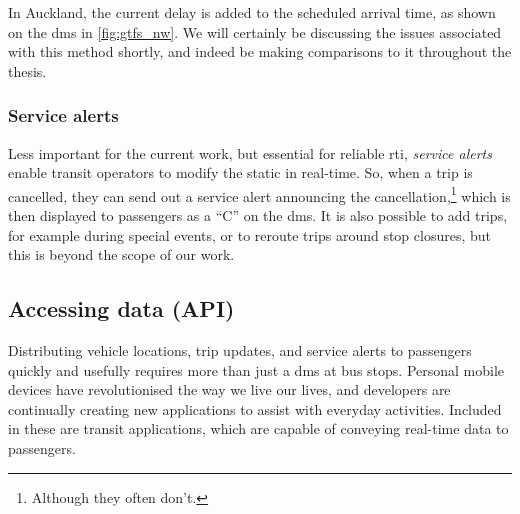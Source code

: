 In Auckland, the current delay is added to the scheduled arrival time, as shown on the \gls{dms} in \cref{fig:gtfs_nw}. We will certainly be discussing the issues associated with this method shortly, and indeed be making comparisons to it throughout the thesis.



\subsubsection{Service alerts}
\label{sec:gtfs_rt_alerts}

Less important for the current work, but essential for reliable \gls{rti}, \emph{service alerts} enable transit operators to modify the static \GTFS{} in real-time. So, when a trip is cancelled, they can send out a service alert announcing the cancellation,\footnote{Although they often don't.} which is then displayed to passengers as a ``C'' on the \gls{dms}. It is also possible to add trips, for example during special events, or to reroute trips around stop closures, but this is beyond the scope of our work.



\subsection{Accessing \rt{} data (API)}
\label{sec:gtfs_rt_api}

Distributing vehicle locations, trip updates, and service alerts to passengers quickly and usefully requires more than just a \gls{dms} at bus stops. Personal mobile devices have revolutionised the way we live our lives, and developers are continually creating new applications to assist with everyday activities. Included in these are transit applications, which are capable of conveying real-time \GTFS{} data to passengers.


